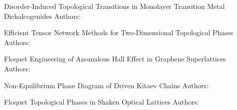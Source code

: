 

\begin{cventries}


\cventryshort
{Disorder-Induced Topological Transitions in Monolayer Transition Metal Dichalcogenides}
{}
{Authors:}
{}


\cventryshort
{Efficient Tensor Network Methods for Two-Dimensional Topological Phases}
{}
{Authors:}
{}


\cventryshort
{Floquet Engineering of Anomalous Hall Effect in Graphene Superlattices}
{}
{Authors:}
{}


\cventryshort
{Non-Equilibrium Phase Diagram of Driven Kitaev Chains}
{}
{Authors:}
{}


\cventryshort
{Floquet Topological Phases in Shaken Optical Lattices}
{}
{Authors:}
{}


\end{cventries}
